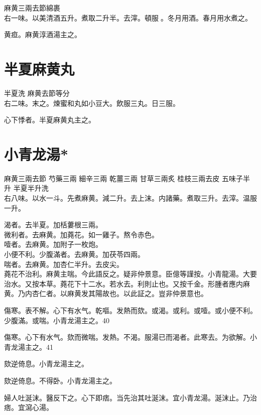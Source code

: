 麻黄{\scriptsize 三兩去節綿裹}\\
右一味。以美清酒五升。煮取二升半。去滓。頓服{\sungtpii 𥁞}。冬月用酒。春月用水煮之。

黄疸。麻黄淳酒湯主之。

\section{半夏麻黄丸}

半夏{\scriptsize 洗} 麻黄{\scriptsize 去節等分}\\
右二味。末之。煉蜜和丸如小豆大。飲服三丸。日三服。

心下悸者。半夏麻黄丸主之。

\section{小青龙湯*}

麻黄{\scriptsize 三兩去節} 芍藥{\scriptsize 三兩} 細辛{\scriptsize 三兩} 乾薑{\scriptsize 三兩} 甘草{\scriptsize 三兩炙} 桂枝{\scriptsize 三兩去皮} 五味子{\scriptsize 半升} 半夏{\scriptsize 半升洗}\\
右八味。以水一斗。先煮麻黄。減二升。去上沫。内諸藥。煮取三升。去滓。温服一升。

渴者。去半夏。加栝蔞根三兩。\\
微利者。去麻黄。加蕘花。如一雞子。熬令赤色。\\
噎者。去麻黄。加附子一枚炮。\\
小便不利。少腹滿者。去麻黄。加茯苓四兩。\\
喘者。去麻黄。加杏仁半升。去皮尖。\\
蕘花不治利。麻黄主喘。今此語反之。疑非仲景意。{\scriptsize 臣億等謹按。小青龍湯。大要治水。又按本草。蕘花下十二水。若水去。利則止也。又按千金。形腫者應内麻黄。乃内杏仁者。以麻黄发其陽故也。以此証之。豈非仲景意也。}

傷寒。表不解。心下有水气。乾嘔。发熱而欬。或渴。或利。或噎。或小便不利。少腹滿。或喘。小青龙湯主之。40

傷寒。心下有水气。欬而微喘。发熱。不渴。服湯已而渴者。此寒去。为欲解。小青龙湯主之。41


欬逆倚息。小青龙湯主之。{\wuben}

欬逆倚息。不得卧。小青龙湯主之。{\dengben}

婦人吐涎沫。醫反下之。心下即痞。当先治其吐涎沫。宜小青龙湯。涎沫止。乃治痞。宜瀉心湯。

